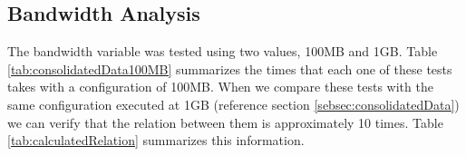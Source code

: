 \subsection{Bandwidth Analysis}
\label{subsec:bandwidthAnalysis}

The bandwidth variable was tested using two values, 100MB and 1GB. Table \ref{tab:consolidatedData100MB} summarizes the times that each one of these tests takes with a configuration of 100MB. When we compare these tests with the same configuration executed at 1GB (reference section \ref{sebsec:consolidatedData}) we can verify that the relation between them is approximately 10 times. Table \ref{tab:calculatedRelation} summarizes this information. 

